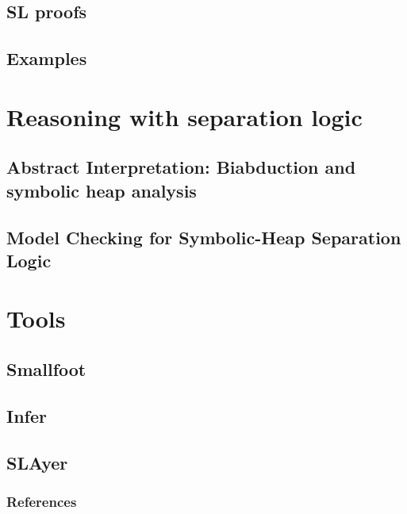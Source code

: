 \documentclass[professionalfont]{beamer}
\begin{document}
    \subsection{SL proofs}
    \subsection{Examples}
    \section{Reasoning with separation logic}
    \subsection{Abstract Interpretation: Biabduction and symbolic heap  analysis}
    \subsection{Model Checking for Symbolic-Heap Separation Logic }
    \section{Tools}
    \subsection{Smallfoot}
    \subsection{Infer}
    \subsection{SLAyer}
    \begin{frame}[allowframebreaks]
     
        \nocite{*}
        \frametitle{References}
        
        
    \end{frame}
\end{document}
